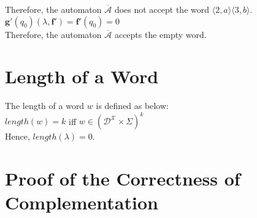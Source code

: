 \documentclass[a4paper, 11pt]{article}
\begin{document}
		Therefore, the automaton $\mathcal{\overline{A}}$ does not accept the word $\langle 2, a \rangle \langle 3, b \rangle$.\\
		
		$\bm{g}'(q_0)(\lambda, \bm{f}') = \bm{f}'(q_0) = 0$\\
		
		Therefore, the automaton $\mathcal{\overline{A}}$ accepts the empty word.
		





\appendix

	\section{Length of a Word}
	
	The length of a word $w$ is defined as below:\\
	$length(w) = k$ iff $w \in (\mathcal{D}^{\mathcal{X}} \times \Sigma)^k$\\
	
	Hence, $length(\lambda) = 0$.

	\section{Proof of the Correctness of Complementation}
\end{document}
